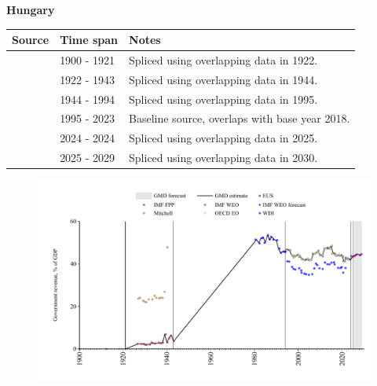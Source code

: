 \documentclass[12pt,a4paper,landscape]{article}
\begin{document}
\begin{adjustbox}{max totalsize={\paperwidth}{\paperheight},center}
\begin{minipage}[t][\textheight][t]{\textwidth}
\vspace*{0.5cm}
{}
\begin{center}
{\Large\bfseries Hungary}
\end{center}
\vspace{0.5cm}
\begin{table}[H]
\centering
\small
\begin{tabular}{|l|l|l|}
\hline
\textbf{Source} & \textbf{Time span} & \textbf{Notes} \\
\hline
\rowcolor{white}\cite{Mitchell}& 1900 - 1921 &Spliced using overlapping data in 1922.\\
\rowcolor{lightgray}\cite{IMF_FPP}& 1922 - 1943 &Spliced using overlapping data in 1944.\\
\rowcolor{white}\cite{WDI}& 1944 - 1994 &Spliced using overlapping data in 1995.\\
\rowcolor{lightgray}\cite{OECD_EO}& 1995 - 2023 &Baseline source, overlaps with base year 2018.\\
\rowcolor{white}\cite{EUS}& 2024 - 2024 &Spliced using overlapping data in 2025.\\
\rowcolor{lightgray}\cite{IMF_WEO_forecast}& 2025 - 2029 &Spliced using overlapping data in 2030.\\
\hline
\end{tabular}
\end{table}
\begin{figure}[H]
\centering
\includegraphics[width=\textwidth,height=0.6\textheight,keepaspectratio]{graphs/HUN_govrev_GDP.pdf}
\end{figure}
\end{minipage}
\end{adjustbox}
\end{document}
